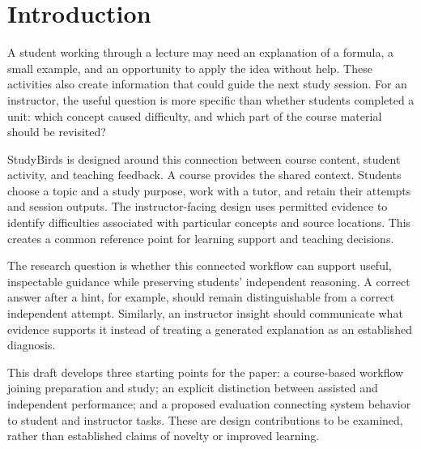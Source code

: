 \section{Introduction}
\label{sec:introduction}

A student working through a lecture may need an explanation of a formula,
a small example, and an opportunity to apply the idea without help.
These activities also create information that could guide the next study
session. For an instructor, the useful question is more specific than
whether students completed a unit: which concept caused difficulty, and
which part of the course material should be revisited?

StudyBirds is designed around this connection between course content,
student activity, and teaching feedback. A course provides the shared
context. Students choose a topic and a study purpose, work with a tutor,
and retain their attempts and session outputs. The instructor-facing
design uses permitted evidence to identify difficulties associated with
particular concepts and source locations. This creates a common reference
point for learning support and teaching decisions.

The research question is whether this connected workflow can support
useful, inspectable guidance while preserving students' independent
reasoning. A correct answer after a hint, for example, should remain
distinguishable from a correct independent attempt. Similarly, an
instructor insight should communicate what evidence supports it instead
of treating a generated explanation as an established diagnosis.

This draft develops three starting points for the paper: a course-based
workflow joining preparation and study; an explicit distinction between
assisted and independent performance; and a proposed evaluation connecting
system behavior to student and instructor tasks. These are design
contributions to be examined, rather than established claims of novelty
or improved learning.
